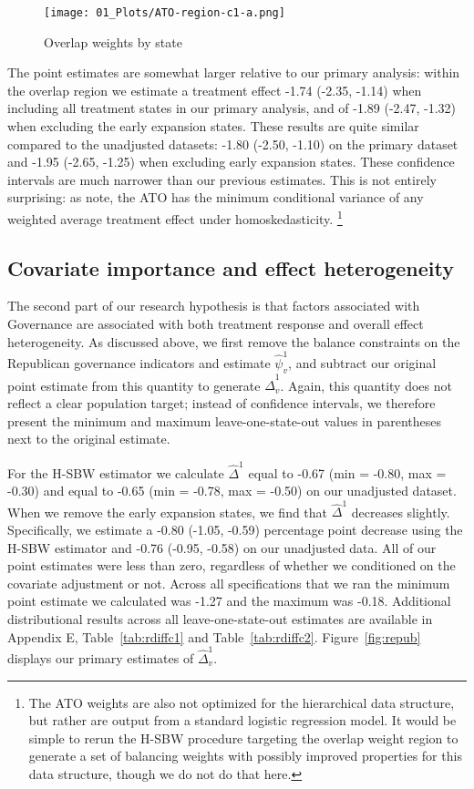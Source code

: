 \documentclass[aoas]{imsart}
\theoremstyle{plain}
\theoremstyle{remark}
\begin{document}
\begin{figure}[H]
\begin{center}
    \caption{Overlap weights by state}
    \label{ATOarea}
    \texttt{[image: 01\_Plots/ATO-region-c1-a.png]}
\end{center}
\end{figure}

The point estimates are somewhat larger relative to our primary analysis: within the overlap region we estimate a treatment effect -1.74 (-2.35, -1.14) when including all treatment states in our primary analysis, and of -1.89 (-2.47, -1.32) when excluding the early expansion states. These results are quite similar compared to the unadjusted datasets: -1.80 (-2.50, -1.10) on the primary dataset and -1.95 (-2.65, -1.25) when excluding early expansion states. These confidence intervals are much narrower than our previous estimates. This is not entirely surprising: as \cite{li2018balancing} note, the ATO has the minimum conditional variance of any weighted average treatment effect under homoskedasticity. \footnote{The ATO weights are also not optimized for the hierarchical data structure, but rather are output from a standard logistic regression model. It would be simple to rerun the H-SBW procedure targeting the overlap weight region to generate a set of balancing weights with possibly improved properties for this data structure, though we do not do that here.}

\subsection{Covariate importance and effect heterogeneity}

The second part of our research hypothesis is that factors associated with Governance are associated with both treatment response and overall effect heterogeneity. As discussed above, we first remove the balance constraints on the Republican governance indicators and estimate $\hat{\psi}^1_v$, and subtract our original point estimate from this quantity to generate $\hat{\Delta}_v^1$. Again, this quantity does not reflect a clear population target; instead of confidence intervals, we therefore present the minimum and maximum leave-one-state-out values in parentheses next to the original estimate.

For the H-SBW estimator we calculate $\hat{\Delta}^1$ equal to -0.67 (min = -0.80, max = -0.30) and equal to -0.65 (min = -0.78, max = -0.50) on our unadjusted dataset. When we remove the early expansion states, we find that $\hat{\Delta}^1$ decreases slightly. Specifically, we estimate a -0.80 (-1.05, -0.59) percentage point decrease using the H-SBW estimator and -0.76 (-0.95, -0.58) on our unadjusted data. All of our point estimates were less than zero, regardless of whether we conditioned on the covariate adjustment or not. Across all specifications that we ran the minimum point estimate we calculated was -1.27 and the maximum was -0.18. Additional distributional results across all leave-one-state-out estimates are available in Appendix E, Table~\ref{tab:rdiffc1} and Table~\ref{tab:rdiffc2}. Figure~\ref{fig:repub} displays our primary estimates of $\hat{\Delta}_v^1$. 
\end{document}
